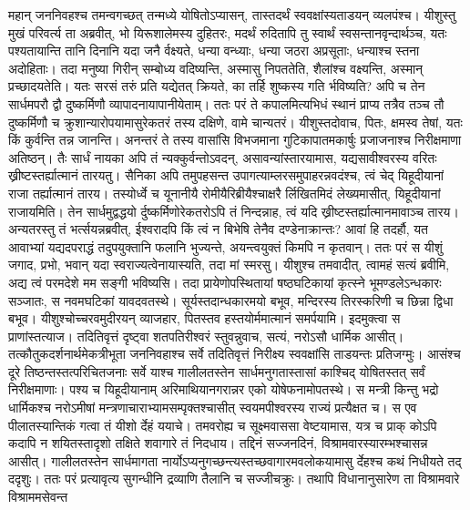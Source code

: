 \vakya महान् जननिवहश्च तमन्वगच्छत् तन्मध्ये योषितोऽप्यासन्, तास्तदर्थं स्ववक्षांस्यताडयन् व्यलपंश्च।
\vakya यीशुस्तु मुखं परिवर्त्य ता अब्रवीत्, भो यिरूशालेमस्य दुहितरः, मदर्थं रुदितापि तु स्वार्थं स्वसन्तानवृन्दार्थञ्च,
\vakya यतः पश्यतायान्ति तानि दिनानि यदा जनै र्वक्ष्यते, धन्या वन्ध्याः, धन्या जठरा अप्रसूताः, धन्याश्च स्तना अदोहिताः।
\vakya तदा मनुष्या गिरीन् सम्बोध्य वदिष्यन्ति, अस्मासु निपततेति, शैलांश्च वक्ष्यन्ति, अस्मान् प्रच्छादयतेति।
\vakya यतः सरसं तरुं प्रति यद्येतत् क्रियते, का तर्हि शुष्कस्य गति र्भविष्यति?
\vakya अपि च तेन सार्धमपरौ द्वौ दुष्कर्मिणौ व्यापादनायापानीयेताम्।
\vakya ततः परं ते कपालमित्यभिधं स्थानं प्राप्य तत्रैव तञ्च तौ दुष्कर्मिणौ च क्रुशान्यारोपयामासुरेकतरं तस्य दक्षिणे, वामे चान्यतरं।
\vakya यीशुस्तदोवाच, पितः, क्षमस्व तेषां, यतः किं कुर्वन्ति तन्न जानन्ति।
\vakya अनन्तरं ते तस्य वासांसि विभजमाना गुटिकापातमकार्षुः प्रजाजनाश्च निरीक्षमाणा अतिष्ठन्। तैः सार्धं नायका अपि तं न्यक्कुर्वन्तोऽवदन्, असावन्यांस्तारयामास, यद्यसावीश्वरस्य वरितः ख्रीष्टस्तर्ह्यात्मानं तारयतु।
\vakya सैनिका अपि तमुपहसन्त उपागत्याम्लरसमुपाहरन्नवदंश्च,
\vakya त्वं चेद् यिहूदीयानां राजा तर्ह्यात्मानं तारय।
\vakya तस्योर्ध्वे च यूनानीयै रोमीयैरिब्रीयैश्चाक्षरै र्लिखितमिदं लेख्यमासीत्, यिहूदीयानां राजायमिति।
\vakya तेन सार्धमुद्वद्धयो र्दुष्कर्मिणोरेकतरोऽपि तं निन्दन्नाह, त्वं यदि ख्रीष्टस्तर्ह्यात्मानमावाञ्च तारय।
\vakya अन्यतरस्तु तं भर्त्सयन्नब्रवीत्, ईश्वरादपि किं त्वं न बिभेषि तेनैव दण्डेनाक्रान्तः?
\vakya आवां हि तदर्हौ, यत आवाभ्यां यद्यदपराद्धं तदुपयुक्तानि फलानि भुज्यन्ते, अयन्त्वयुक्तं किमपि न कृतवान्।
\vakya ततः परं स यीशुं जगाद, प्रभो, भवान् यदा स्वराज्यत्वेनायास्यति, तदा मां स्मरसु।
\vakya यीशुश्च तमवादीत्, त्वामहं सत्यं ब्रवीमि, अद्य त्वं परमदेशे मम सङ्गी भविष्यसि।
\vakya तदा प्रायेणोपस्थितायां षष्ठघटिकायां कृत्स्ने भूमण्डलेऽन्धकारः सञ्जातः, स नवमघटिकां यावदवतस्थे।
\vakya सूर्यस्तदान्धकारमयो बभूव, मन्दिरस्य तिरस्करिणी च छिन्ना द्विधा बभूव।
\vakya यीशुश्चोच्चरवमुदीरयन् व्याजहार, पितस्तव हस्तयोर्ममात्मानं समर्पयामि। इदमुक्त्वा स प्राणांस्तत्याज।
\vakya तदितिवृत्तं दृष्ट्वा शतपतिरीश्वरं स्तुवन्नुवाच, सत्यं, नरोऽसौ धार्मिक आसीत्।
\vakya तत्कौतुकदर्शनार्थमेकत्रीभूता जननिवहाश्च सर्वे तदितिवृत्तं निरीक्ष्य स्ववक्षांसि ताडयन्तः प्रतिजग्मुः।
\vakya आसंश्च दूरे तिष्ठन्तस्तत्परिचितजनाः सर्वे याश्च गालीलतस्तेन सार्धमनुगतास्तासां काश्चिद् योषितस्तत् सर्वं निरीक्षमाणाः।
\vakya पश्य च यिहूदीयानाम् अरिमाथियानगरान्नर एको योषेफनामोपतस्थे।
\vakya स मन्त्री किन्तु भद्रो धार्मिकश्च नरोऽमीषां मन्त्रणाचाराभ्यामसम्पृक्तश्चासीत् स्वयमपीश्वरस्य राज्यं प्रत्यैक्षत च।
\vakya स एव पीलातस्यान्तिकं गत्वा तं यीशो र्देहं ययाचे।
\vakya तमवरोह्य च सूक्ष्मवाससा वेष्टयामास, यत्र च प्राक् कोऽपि कदापि न शयितस्तादृशो तक्षिते शवागारे तं निदधाय।
\vakya तद्दिनं सज्जनदिनं, विश्रामवारस्यारम्भश्चासन्न आसीत्।
\vakya गालीलतस्तेन सार्धमागता नार्योऽप्यनुगच्छन्त्यस्तच्छवागारमवलोकयामासु र्देहश्च कथं निधीयते तद् ददृशुः।
\vakya ततः परं प्रत्यावृत्य सुगन्धीनि द्रव्याणि तैलानि च सज्जीचक्रुः। तथापि विधानानुसारेण ता विश्रामवारे विश्राममसेवन्त\eoc